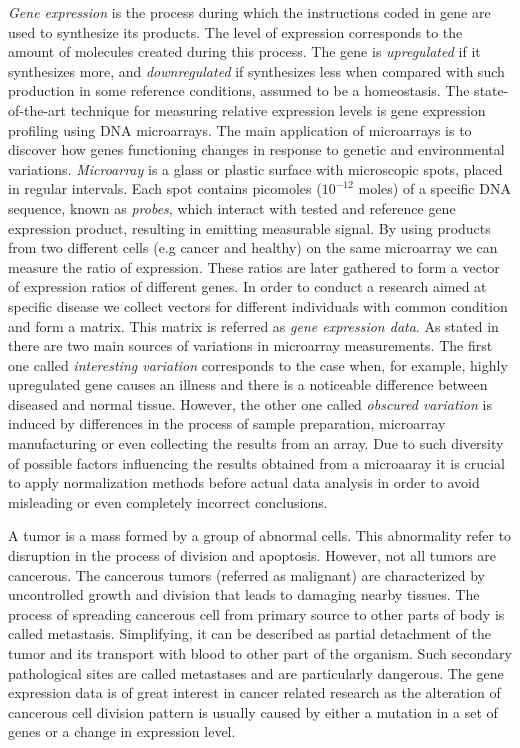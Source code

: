 \documentclass[12pt, wide]{mwart}
\begin{document}
\textit{Gene expression} is the process during which the instructions coded in gene are used to synthesize its products. The level of expression corresponds to the amount of molecules created during this process. The gene is \textit{upregulated} if it synthesizes more, and \textit{downregulated} if synthesizes less when compared with such production in some reference conditions, assumed to be a homeostasis. The state-of-the-art technique for measuring relative expression levels is gene expression profiling using DNA microarrays. The main application of microarrays is to discover how genes functioning changes in response to genetic and environmental variations. \textit{Microarray} is a glass or plastic surface with microscopic spots, placed in regular intervals. Each spot contains picomoles ($10^{-12}$ moles) of a specific DNA sequence, known as \textit{probes}, which interact with tested and reference gene expression product, resulting in emitting measurable signal. By using products from two different cells (e.g cancer and healthy) on the same microarray we can measure the ratio of expression. These ratios are later gathered to form a vector of expression ratios of different genes. In order to conduct a research aimed at specific disease we collect vectors for different individuals with common condition and form a matrix. This matrix is referred as \textit{gene expression data}. As stated in \cite{preprocessing} there are two main sources of variations in microarray measurements. The first one called \textit{interesting variation} corresponds to the case when, for example, highly upregulated gene causes an illness and there is a noticeable difference between diseased and normal tissue. However, the other one called \textit{obscured variation} is induced by differences in the process of sample preparation, microarray manufacturing or even collecting the results from an array. Due to such diversity of possible factors influencing the results obtained from a microaaray it is crucial to apply normalization methods before actual data analysis in order to avoid misleading or even completely incorrect conclusions.

A tumor is a mass formed by a group of abnormal cells. This abnormality refer to disruption in the process of division and apoptosis. However, not all tumors are cancerous. The cancerous tumors (referred as malignant) are characterized by uncontrolled growth and division that leads to damaging nearby tissues. The process of spreading cancerous cell from primary source to other parts of body is called metastasis. Simplifying, it can be described as partial detachment of the tumor and its transport with blood to other part of the organism. Such secondary pathological sites are called metastases and are particularly dangerous. The gene expression data is of great interest in cancer related research as the alteration of cancerous cell division pattern is usually caused by either a mutation in a set of genes or a change in expression level.
\end{document}
